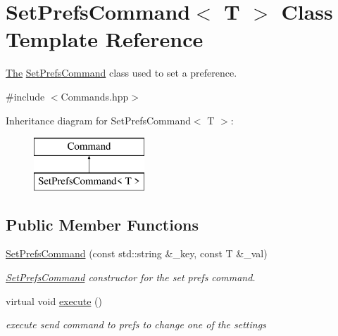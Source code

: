 \hypertarget{class_set_prefs_command}{}\section{Set\+Prefs\+Command$<$ T $>$ Class Template Reference}
\label{class_set_prefs_command}


\hyperlink{namespace_the}{The} \hyperlink{class_set_prefs_command}{Set\+Prefs\+Command} class used to set a preference.  




{\ttfamily \#include $<$Commands.\+hpp$>$}

Inheritance diagram for Set\+Prefs\+Command$<$ T $>$\+:\begin{figure}[H]
\begin{center}
\leavevmode
\includegraphics[height=2.000000cm]{class_set_prefs_command}
\end{center}
\end{figure}
\subsection*{Public Member Functions}
\begin{DoxyCompactItemize}
\item 
\hyperlink{class_set_prefs_command_ac330553b21c0934846ff2c719f05b6b1}{Set\+Prefs\+Command} (const std\+::string \&\+\_\+key, const T \&\+\_\+val)
\begin{DoxyCompactList}\small\item\em \hyperlink{class_set_prefs_command}{Set\+Prefs\+Command} constructor for the set prefs command. \end{DoxyCompactList}\item 
\hypertarget{class_set_prefs_command_a60a041e8c0ce1b0a7db897be6f8ef587}{}virtual void \hyperlink{class_set_prefs_command_a60a041e8c0ce1b0a7db897be6f8ef587}{execute} ()\label{class_set_prefs_command_a60a041e8c0ce1b0a7db897be6f8ef587}

\begin{DoxyCompactList}\small\item\em execute send command to prefs to change one of the settings \end{DoxyCompactList}\end{DoxyCompactItemize}


